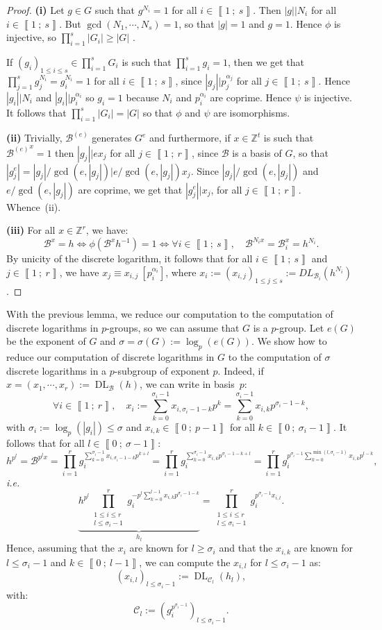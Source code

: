 \documentclass[a4paper,10pt]{report}
\theoremstyle{definition}
\theoremstyle{plain}
\theoremstyle{definition}
\newcommand{\ie}{\emph{i.e.}\ }
\newcommand{\Z}{\mathbb{Z}}
\newcommand{\m}[1]{\mathcal{#1}}
\newcommand{\mC}{\mathcal{C}}
\renewcommand{\i}[2]{\left\llbracket #1~;~#2\right\rrbracket}
\renewcommand{\(}{\left(}
\renewcommand{\)}{\right)}
\DeclareMathOperator{\DL}{DL}
\begin{document}
\begin{proof}
\textbf{(i)} Let $g\in G$ such that $g^{N_i}=1$ for all $i\in\i{1}{s}$. Then $|g||N_i$ for all $i\in\i{1}{s}$. But $\gcd(N_1,\cdots, N_s)=1$, so that $|g|=1$ and $g=1$. Hence $\phi$ is injective, so $\prod_{i=1}^s|G_i|\geq |G|$ .

If $(g_i)_{1\leq i\leq s} \in  \prod_{i=1}^s G_i$ is such that $\prod_{i=1}^s g_i=1$, then we get that $\prod_{j=1}^s g_j^{N_i}=g_i^{N_i}=1$ for all $i\in\i{1}{s}$,  since $|g_j||p_j^{\alpha_j}$ for all $j\in\i{1}{s}$.  Hence $|g_i||N_i$ and $|g_i||p_i^{\alpha_i}$ so $g_i=1$ because $N_i$ and $p_i^{\alpha_i}$ are coprime. Hence $\psi$ is injective. It follows that $\prod_{i=1}^s|G_i|=|G|$ so that $\phi$ and $\psi$ are isomorphisms.  

\textbf{(ii)} Trivially, $\m{B}^{(e)}$ generates $G^e$ and furthermore, if $x\in\Z^t$ is such that ${\m{B}^{(e)}}^x=1$ then $|g_j||e x_j$ for all $j\in\i{1}{r}$, since $\m{B}$ is a basis of $G$, so that $|g_j^{e}|=|g_j|/\gcd(e,|g_j|)|e/\gcd(e,|g_j|)x_j$. Since $|g_j|/\gcd(e,|g_j|)$ and $e/\gcd(e,|g_j|)$ are coprime, we get that $|g_j^{e}||x_j$, for all $j\in\i{1}{r}$. Whence~(ii).

\textbf{(iii)} For all $x\in\Z^r$, we have:
\[\m{B}^x=h\Longleftrightarrow \phi(\m{B}^xh^{-1})=1\Longleftrightarrow \forall i\in\i{1}{s}, \quad \m{B}^{N_i x}=\m{B}_i^x=h^{N_i}.\]
By unicity of the discrete logarithm, it follows that for all $i\in\i{1}{s}$ and $j\in\i{1}{r}$, we have $x_j\equiv x_{i,j}\ [p_i^{\alpha_i}]$, where $x_i:=(x_{i,j})_{1\leq j\leq s}:=DL_{\m{B}_i}(h^{N_i})$. 
\end{proof}

With the previous lemma, we reduce our computation to the computation of discrete logarithms in $p$-groups, so we can assume that $G$ is a $p$-group.  Let $e(G)$ be the exponent of $G$ and $\sigma=\sigma(G):=\log_p(e(G))$. We show how to reduce our computation of discrete logarithms in $G$ to the computation of $\sigma$ discrete logarithms in a $p$-subgroup of exponent $p$.  Indeed, if $x=(x_1,\cdots, x_r):=\DL_{\m{B}}(h)$, we can write in basis~$p$:
\[\forall i\in\i{1}{r}, \quad x_i:=\sum_{k=0}^{\sigma_i-1}x_{i,\sigma_i-1-k} p^k=\sum_{k=0}^{\sigma_i-1}x_{i,k} p^{\sigma_i-1-k},\]
with $\sigma_i:=\log_p(|g_i|)\leq \sigma$ and $x_{i,k}\in\i{0}{p-1}$ for all $k\in\i{0}{\sigma_i-1}$.  It follows that for all $l\in\i{0}{\sigma-1}$:
\[h^{p^{l}}=\m{B}^{p^l x}=\prod_{i=1}^r g_i^{\sum_{k=0}^{\sigma_i-1}x_{i,\sigma_i-1-k} p^{k+l}}=\prod_{i=1}^r g_i^{\sum_{k=0}^{\sigma_i-1}x_{i,k} p^{\sigma_i-1-k+l}}=\prod_{i=1}^r g_i^{p^{\sigma_i-1}\sum_{k=0}^{\min(l,\sigma_i-1)}x_{i,k} p^{l-k}},\]
\ie
\[\underbrace{h^{p^{l}}\prod_{\substack{1\leq i\leq r\\ l\leq \sigma_i-1}}^r g_i^{-p^l\sum_{k=0}^{l-1}x_{i,k}p^{\sigma_i-1-k}}}_{h_l}=\prod_{\substack{1\leq i\leq r\\ l\leq \sigma_i-1}}^r g_i^{p^{\sigma_i-1}x_{i,l}}.\]
Hence, assuming that the $x_i$ are known for $l\geq \sigma_i$ and that the $x_{i,k}$ are known for $l\leq \sigma_i-1$ and $k\in\i{0}{l-1}$, we can compute the $x_{i,l}$ for $l\leq \sigma_i-1$ as:
\[(x_{i,l})_{ l\leq \sigma_i-1}:=\DL_{\mC_l}(h_l),\]
with:
\[\mC_l:=(g_i^{p^{\sigma_i-1}})_{ l\leq \sigma_i-1}.\] 
\end{document}

